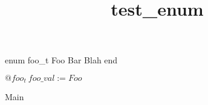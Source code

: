 \documentclass[8pt]{article}
\title{test\_enum}
\begin{document}
\maketitle
enum foo\_t 
  Foo
   Bar
   Blah
end


\begin{algorithm}[H]
$@foo_t\:foo\_val := Foo$\;
\caption{Main}
\end{algorithm}
\end{document}
